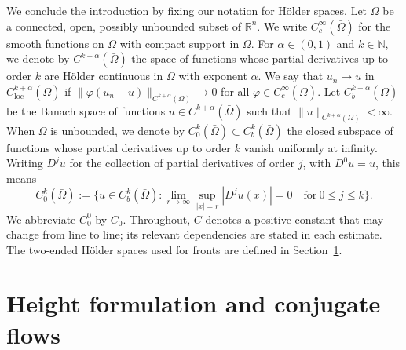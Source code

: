 \documentclass[12pt,letterpaper]{amsart}
\numberwithin{equation}{section}
\def\sech{\mathrm{sech}}
\def\R{{\mathbb R}}
\begin{document}
{We conclude the introduction by fixing our notation for H\"older spaces.} Let $\Omega$ be a connected, open, possibly unbounded subset of $\R^n$. {We write $C_c^\infty(\bar\Omega)$ for the smooth functions on $\bar\Omega$ with compact support in $\bar\Omega$.} For {$\alpha\in(0,1)$} {and $k\in\mathbb{N}$, we denote} by $C^{k+\alpha}(\bar\Omega)$ the space of functions whose partial derivatives up to order $k$ are H\"older continuous in $\bar\Omega$ with exponent $\alpha$. We say that $u_n\to u$ in $C_{\mathrm{loc}}^{k+\alpha}(\bar\Omega)$ if $\|\varphi(u_n-u)\|_{C^{k+\alpha}(\Omega)}\to0$ for all $\varphi\in C_{c}^\infty(\bar\Omega)$.
Let $C_b^{k+\alpha}(\bar\Omega)$ be the Banach space of functions $u\in C^{k+\alpha}(\bar\Omega)$ such that $\|u\|_{C^{k+\alpha}(\Omega)}<\infty$.
When $\Omega$ is unbounded, {we denote by $C_0^k(\bar\Omega)\subset C_b^k(\bar\Omega)$ the closed subspace} of functions {whose partial derivatives up to order $k$ vanish uniformly at infinity. Writing $D^j u$ for the collection of partial derivatives of order $j$, with $D^0u=u$, this means}
\begin{equation*}
    C_0^k(\bar\Omega):=\bigg\{u\in C_b^k(\bar\Omega):\lim_{r\to\infty}\sup_{|x|=r}|D^j u(x)|=0\quad\mathrm{for~}0\leq j\leq k\bigg\}.
\end{equation*}
{We abbreviate $C_0^0$ by $C_0$. Throughout, $C$ denotes a positive constant that may change from line to line; its relevant dependencies are stated in each estimate. The two-ended H\"older spaces used for fronts are defined in Section~\ref{sec:formulation}.}






\section{{Height formulation and conjugate flows}}\label{sec:formulation}
\end{document}
